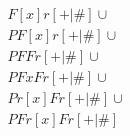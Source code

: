 \documentclass{article}
\begin{document}
\begin{align*}
  & F[x]r[+|\#] \cup \\
  & PF[x]r[+|\#] \cup \\
  & PFFr[+|\#] \cup \\
  & PFxFr[+|\#] \cup \\
  & Pr[x]Fr[+|\#] \cup \\
  & PFr[x]Fr[+|\#]
\end{align*}
\end{document}
